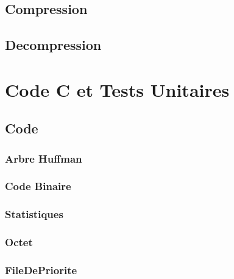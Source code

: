 \documentclass{article}
\begin{document}
\subsection{\textbf{Compression}}



\subsection{\textbf{Decompression}}



\newpage

\section{Code C et Tests Unitaires}

\subsection{Code}
\subsubsection{\textbf{Arbre Huffman}}


\subsubsection{\textbf{Code Binaire}}


\subsubsection{\textbf{Statistiques}}


\subsubsection{\textbf{Octet}}


\subsubsection{\textbf{FileDePriorite}}

\end{document}
